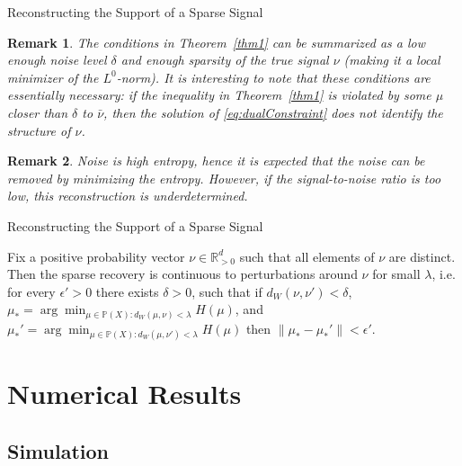\documentclass{beamer}
\newcommand{\R}{{\mathbb{R}}}
\newcommand{\bbP}{{\mathbb{P}}}
\newtheorem*{remark}{Remark}
\begin{document}
\begin{frame}{Reconstructing the Support of a Sparse Signal \cite{rawson_astro}}

\vspace{-5ex}

\begin{remark}
    The conditions in Theorem~\ref{thm1} can be summarized as a low enough noise level $\delta$ and enough sparsity of the true signal $\nu$ (making it a local minimizer of the $L^0$-norm). \pause
    It is interesting to note that these conditions are essentially necessary: if the inequality in Theorem~\ref{thm1} is violated by some $\mu$ closer than $\delta$ to $\bar\nu$, then the solution of \eqref{eq:dualConstraint} does not identify the structure of $\nu$. 
\end{remark}
\pause

\begin{remark}
    Noise is high entropy, hence it is expected that the noise can be removed by minimizing the entropy. \pause
    However, if the signal-to-noise ratio is too low, this reconstruction is underdetermined.
\end{remark}

\end{frame}

\begin{frame}{Reconstructing the Support of a Sparse Signal}

\begin{theorem}
    Fix a positive probability vector $\nu\in\R^d_{>0}$ such that all elements of $\nu$ are distinct. 
    \pause
    Then the sparse recovery is continuous to perturbations around $\nu$ for small $\lambda$, i.e. for every $\epsilon'>0$ there exists $\delta>0$, such that 
    if $d_W(\nu,\nu')<\delta$,
    $\mu_* = \arg\min_{\mu \in \bbP(X) : d_W(\mu, \nu)<\lambda} H(\mu)$,
    and 
    $\mu_*' = \arg\min_{\mu \in \bbP(X) : d_W(\mu, \nu')<\lambda} H(\mu)$
    \pause
    then $\|\mu_*-\mu_*'\| < \epsilon'.$
    \label{thm:robust}
\end{theorem}

\end{frame}


\section{Numerical Results}

\subsection{Simulation}
\end{document}
